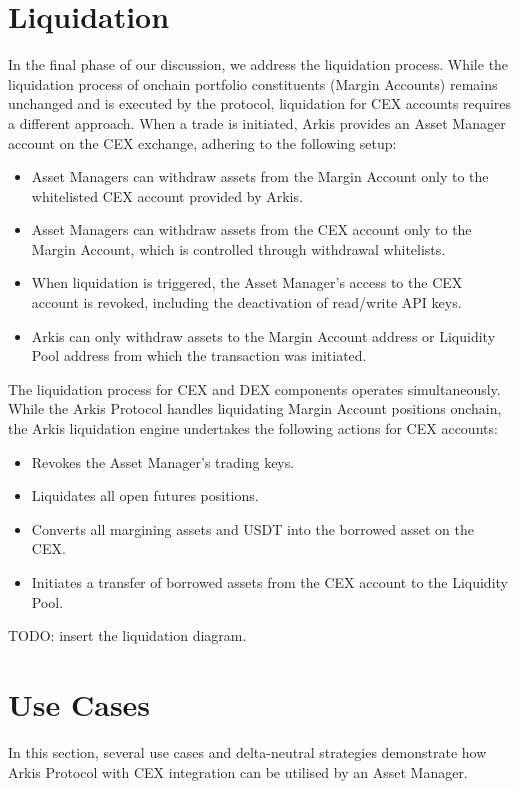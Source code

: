 \documentclass[conference]{IEEEtran}
\begin{document}
\section{Liquidation}

In the final phase of our discussion, we address the liquidation process. While the liquidation process of onchain portfolio constituents (Margin Accounts) remains unchanged and is executed by the protocol, liquidation for CEX accounts requires a different approach. When a trade is initiated, Arkis provides an Asset Manager account on the CEX exchange, adhering to the following setup:
\begin{itemize}
	\item Asset Managers can withdraw assets from the Margin Account only to the whitelisted CEX account provided by Arkis.
	\item Asset Managers can withdraw assets from the CEX account only to the Margin Account, which is controlled through withdrawal whitelists.
	\item When liquidation is triggered, the Asset Manager's access to the CEX account is revoked, including the deactivation of read/write API keys.
	\item Arkis can only withdraw assets to the Margin Account address or Liquidity Pool address from which the transaction was initiated.
\end{itemize}


The liquidation process for CEX and DEX components operates simultaneously. While the Arkis Protocol handles liquidating Margin Account positions onchain, the Arkis liquidation engine undertakes the following actions for CEX accounts:
\begin{itemize}
	\item Revokes the Asset Manager's trading keys.
	\item Liquidates all open futures positions.
	\item Converts all margining assets and USDT into the borrowed asset on the CEX.
	\item Initiates a transfer of borrowed assets from the CEX account to the Liquidity Pool.
\end{itemize}

TODO: insert the liquidation diagram. 

\section{Use Cases}

In this section, several use cases and delta-neutral strategies demonstrate how Arkis Protocol with CEX integration can be utilised by an Asset Manager.
\end{document}
